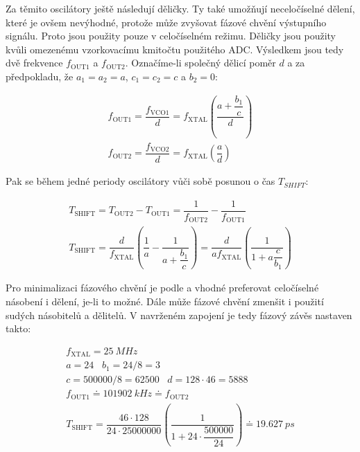 Za těmito oscilátory ještě následují děličky. Ty také umožňují neceločíselné dělení, které je ovšem nevýhodné, protože může zvyšovat fázové chvění výstupního signálu. Proto jsou použity pouze v celočíselném režimu. Děličky jsou použity kvůli omezenému vzorkovacímu kmitočtu použitého \acrshort{ADC}. Výsledkem jsou tedy dvě frekvence $f_\mathrm{OUT1}$ a $f_\mathrm{OUT2}$. Označíme-li společný dělicí poměr $d$ a za předpokladu, že $a_1=a_2=a$, $c_1=c_2=c$ a $b_2=0$:

\begin{equation}
\begin{gathered}
f_\mathrm{OUT1}=\dfrac{f_\mathrm{VCO1}}{d}=f_\mathrm{XTAL} \left(\dfrac{a+\dfrac{b_1}{c} }{d}\right) \\
f_\mathrm{OUT2}=\dfrac{f_\mathrm{VCO2}}{d}=f_\mathrm{XTAL} \left(\dfrac{a}{d}\right)
\end{gathered}
\end{equation}

Pak se během jedné periody oscilátory vůči sobě posunou o čas $T_{SHIFT}$:

\begin{equation}
\begin{gathered}
T_\mathrm{SHIFT}=T_\mathrm{OUT2}-T_\mathrm{OUT1}=\dfrac{1}{f_\mathrm{OUT2}} - \dfrac{1}{f_\mathrm{OUT1}} \\
T_\mathrm{SHIFT}=\dfrac{d}{f_\mathrm{XTAL}} \left(\dfrac{1}{a} - \dfrac{1}{a+\dfrac{b_1}{c}}\right) = \dfrac{d}{a f_\mathrm{XTAL}} \left(\dfrac{1}{1+a\dfrac{c}{b_1}}\right)
\end{gathered}
\label{equation_tshift}
\end{equation}

Pro minimalizaci fázového chvění je podle \cite{Si5351datasheet} a \cite{Si5351applicationnote} vhodné preferovat celočíselné násobení i dělení, je-li to možné. Dále může fázové chvění zmenšit i použití sudých násobitelů a dělitelů. V navrženém zapojení je tedy fázový závěs nastaven takto:

\begin{equation}
\begin{gathered}
f_\mathrm{XTAL}=\SI{25}{MHz} \\
a=24 \;\;\; b_1=24/8=3 \\
c=500000/8=62500 \;\;\; d=128 \cdot 46=5888 \\
f_\mathrm{OUT1} \doteq \SI{101902}{kHz} \doteq f_\mathrm{OUT2} \\
T_\mathrm{SHIFT} = \dfrac{46 \cdot 128}{24 \cdot 25000000} \left(\dfrac{1}{1+24 \cdot \dfrac{500000}{24}}\right) \doteq \SI{19.627}{ps}
\end{gathered}
\end{equation}

